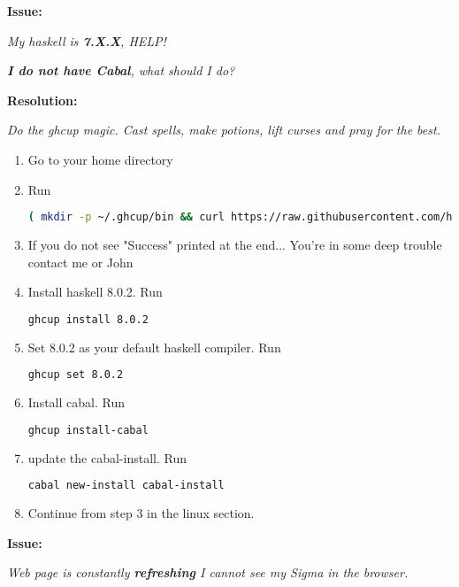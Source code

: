 \documentclass[11pt,a4paper]{article}
\begin{document}
 \textbf{Issue:}
 
\textit{ My haskell is \textbf{7.X.X}, HELP!}
 
\textit{ \textbf{I do not have Cabal}, what should I do?}

\textbf{Resolution:}
 
        \textit{Do the ghcup magic. Cast spells, make potions, lift curses and pray for the best.}
        
        \begin{enumerate}
             
        \item Go to your home directory
        \item Run
\begin{lstlisting}[language=Bash,breaklines]
( mkdir -p ~/.ghcup/bin && curl https://raw.githubusercontent.com/haskell/ghcup/master/ghcup > ~/.ghcup/bin/ghcup && chmod +x ~/.ghcup/bin/ghcup) && echo "Success"
\end{lstlisting}
        \item If you do not see "Success" printed at the end... You're in some deep trouble contact me or John
        \item Install haskell 8.0.2. Run 
\begin{lstlisting}[language=Bash]
ghcup install 8.0.2
\end{lstlisting}
        \item Set 8.0.2 as your default haskell compiler. Run
\begin{lstlisting}[language=Bash]
ghcup set 8.0.2
\end{lstlisting}
        
        \item Install cabal. Run
\begin{lstlisting}[language=Bash]
ghcup install-cabal
\end{lstlisting}

        \item update the cabal-install. Run
\begin{lstlisting}[language=Bash]
cabal new-install cabal-install
\end{lstlisting}

        \item Continue from step 3 in the linux section.
        \end{enumerate}

 \textbf{Issue:}
 
 \textit{Web page is constantly \textbf{refreshing} I cannot see my Sigma in the browser.}
 
\end{document}
